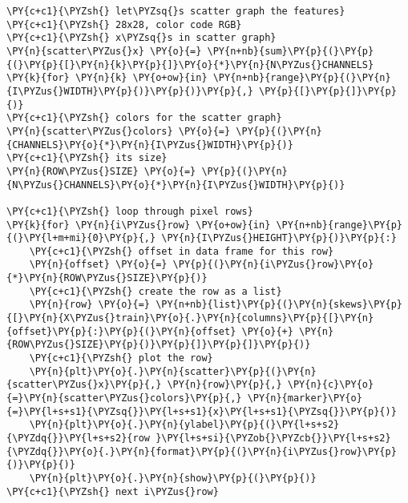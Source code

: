     \begin{tcolorbox}[breakable, size=fbox, boxrule=1pt, pad at break*=1mm,colback=cellbackground, colframe=cellborder]
\begin{Verbatim}[commandchars=\\\{\}]
\PY{c+c1}{\PYZsh{} let\PYZsq{}s scatter graph the features}
\PY{c+c1}{\PYZsh{} 28x28, color code RGB}
\PY{c+c1}{\PYZsh{} x\PYZsq{}s in scatter graph}
\PY{n}{scatter\PYZus{}x} \PY{o}{=} \PY{n+nb}{sum}\PY{p}{(}\PY{p}{(}\PY{p}{[}\PY{n}{k}\PY{p}{]}\PY{o}{*}\PY{n}{N\PYZus{}CHANNELS} \PY{k}{for} \PY{n}{k} \PY{o+ow}{in} \PY{n+nb}{range}\PY{p}{(}\PY{n}{I\PYZus{}WIDTH}\PY{p}{)}\PY{p}{)}\PY{p}{,} \PY{p}{[}\PY{p}{]}\PY{p}{)}
\PY{c+c1}{\PYZsh{} colors for the scatter graph}
\PY{n}{scatter\PYZus{}colors} \PY{o}{=} \PY{p}{(}\PY{n}{CHANNELS}\PY{o}{*}\PY{n}{I\PYZus{}WIDTH}\PY{p}{)}
\PY{c+c1}{\PYZsh{} its size}
\PY{n}{ROW\PYZus{}SIZE} \PY{o}{=} \PY{p}{(}\PY{n}{N\PYZus{}CHANNELS}\PY{o}{*}\PY{n}{I\PYZus{}WIDTH}\PY{p}{)}

\PY{c+c1}{\PYZsh{} loop through pixel rows}
\PY{k}{for} \PY{n}{i\PYZus{}row} \PY{o+ow}{in} \PY{n+nb}{range}\PY{p}{(}\PY{l+m+mi}{0}\PY{p}{,} \PY{n}{I\PYZus{}HEIGHT}\PY{p}{)}\PY{p}{:}
    \PY{c+c1}{\PYZsh{} offset in data frame for this row}
    \PY{n}{offset} \PY{o}{=} \PY{p}{(}\PY{n}{i\PYZus{}row}\PY{o}{*}\PY{n}{ROW\PYZus{}SIZE}\PY{p}{)}
    \PY{c+c1}{\PYZsh{} create the row as a list}
    \PY{n}{row} \PY{o}{=} \PY{n+nb}{list}\PY{p}{(}\PY{n}{skews}\PY{p}{[}\PY{n}{X\PYZus{}train}\PY{o}{.}\PY{n}{columns}\PY{p}{[}\PY{n}{offset}\PY{p}{:}\PY{p}{(}\PY{n}{offset} \PY{o}{+} \PY{n}{ROW\PYZus{}SIZE}\PY{p}{)}\PY{p}{]}\PY{p}{]}\PY{p}{)}
    \PY{c+c1}{\PYZsh{} plot the row}
    \PY{n}{plt}\PY{o}{.}\PY{n}{scatter}\PY{p}{(}\PY{n}{scatter\PYZus{}x}\PY{p}{,} \PY{n}{row}\PY{p}{,} \PY{n}{c}\PY{o}{=}\PY{n}{scatter\PYZus{}colors}\PY{p}{,} \PY{n}{marker}\PY{o}{=}\PY{l+s+s1}{\PYZsq{}}\PY{l+s+s1}{x}\PY{l+s+s1}{\PYZsq{}}\PY{p}{)}
    \PY{n}{plt}\PY{o}{.}\PY{n}{ylabel}\PY{p}{(}\PY{l+s+s2}{\PYZdq{}}\PY{l+s+s2}{row }\PY{l+s+si}{\PYZob{}\PYZcb{}}\PY{l+s+s2}{\PYZdq{}}\PY{o}{.}\PY{n}{format}\PY{p}{(}\PY{n}{i\PYZus{}row}\PY{p}{)}\PY{p}{)}
    \PY{n}{plt}\PY{o}{.}\PY{n}{show}\PY{p}{(}\PY{p}{)}
\PY{c+c1}{\PYZsh{} next i\PYZus{}row}
\end{Verbatim}
\end{tcolorbox}

    \begin{center}
    \end{center}
    { \hspace*{\fill} \\}
    
